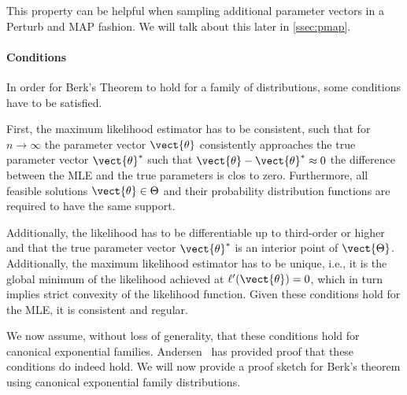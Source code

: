         This property can be helpful when sampling additional parameter vectors in a Perturb and MAP fashion. We will talk about this later in \autoref{ssec:pmap}.
        
        \paragraph*{Conditions}
        In order for Berk's Theorem to hold for a family of distributions, some conditions have to be satisfied.

        First, the maximum likelihood estimator has to be consistent, such that for $n\rightarrow \infty$ the parameter vector $\vect{\theta}$ consistently approaches the true parameter vector $\vect{\theta}^*$ such that $\vect{\theta} - \vect{\theta}^* \approx 0$ the difference between the MLE and the true parameters is clos to zero.
        Furthermore, all feasible solutions $\vect{\theta}  \in \Theta$ and their probability distribution functions are required to have the same support.
        
        Additionally, the likelihood has to be differentiable up to third-order or higher and that the true parameter vector $\vect{\theta}^*$ is an interior point of $\vect{\Theta}$.
        Additionally, the maximum likelihood estimator has to be unique, i.e., it is the global minimum of the likelihood achieved at $\ell'(\vect{\theta}) = 0$, which in turn implies strict convexity of the likelihood function.
        Given these conditions hold for the MLE, it is consistent and regular.

        We now assume, without loss of generality, that these conditions hold for canonical exponential families.
        Andersen~\cite{andersen1970asymptotic} has provided proof that these conditions do indeed hold.
        We will now provide a proof sketch for Berk's theorem using canonical exponential family distributions.


